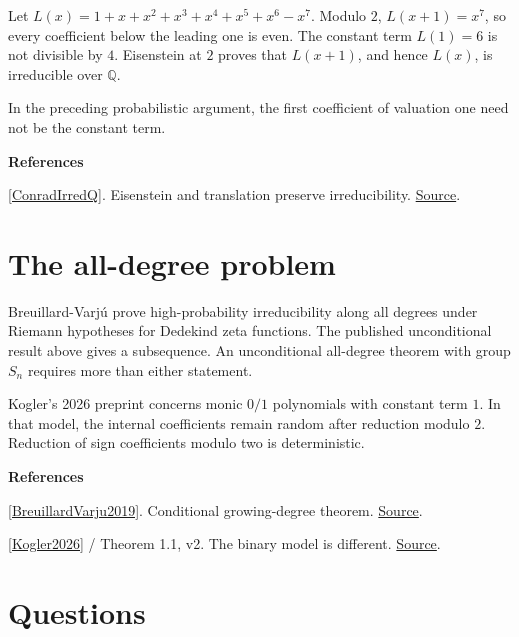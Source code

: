 \documentclass[11pt,a4paper,oneside,openany]{book}
\newenvironment{sources}{\par\smallskip\begingroup\footnotesize\color{atlasgray}\leftskip=10pt\setlength{\parskip}{2pt}}{\par\endgroup\smallskip}
\begin{document}
\begin{atlasblock}[standard]
\color{black} Let \(L(x)=1+x+x^2+x^3+x^4+x^5+x^6-x^7\). Modulo \(2\), \(L(x+1)=x^7\), so every coefficient below the leading one is even. The constant term \(L(1)=6\) is not divisible by \(4\). Eisenstein at \(2\) proves that \(L(x+1)\), and hence \(L(x)\), is irreducible over \(\mathbb Q\).\par
\end{atlasblock}\color{black}
\color{black} In the preceding probabilistic argument, the first coefficient of valuation one need not be the constant term.\par
\begin{sources}
\textbf{References}\par\smallskip
\noindent\hyperlink{ref:ConradIrredQ}{[ConradIrredQ]}. Eisenstein and translation preserve irreducibility. \href{https://kconrad.math.uconn.edu/blurbs/ringtheory/irredtestsoverQ.pdf}{Source}.\par
\end{sources}\color{black}
\section{The all-degree problem}
\color{black} Breuillard-Varjú prove high-probability irreducibility along all degrees under Riemann hypotheses for Dedekind zeta functions. The published unconditional result above gives a subsequence. An unconditional all-degree theorem with group \(S_n\) requires more than either statement.\par
\color{black} Kogler's 2026 preprint concerns monic \(0/1\) polynomials with constant term \(1\). In that model, the internal coefficients remain random after reduction modulo \(2\). Reduction of sign coefficients modulo two is deterministic.\par
\begin{sources}
\textbf{References}\par\smallskip
\noindent\hyperlink{ref:BreuillardVarju2019}{[BreuillardVarju2019]}. Conditional growing-degree theorem. \href{https://arxiv.org/abs/1810.13360}{Source}.\par
\noindent\hyperlink{ref:Kogler2026}{[Kogler2026]} / Theorem 1.1, v2. The binary model is different. \href{https://arxiv.org/abs/2609.26771v2}{Source}.\par
\end{sources}\color{black}
\section*{Questions}
\end{document}
